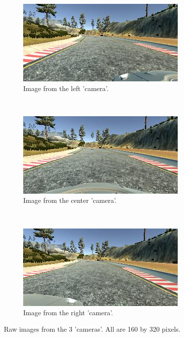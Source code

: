 \documentclass[12pt,a4paper]{article}
\begin{document}
\begin{figure}
    \centering
    \begin{subfigure}[b]{0.3\textwidth}
        \includegraphics[width=\textwidth]{left.jpg}
        \caption{Image from the left 'camera'.}
        \label{fig:left}
    \end{subfigure}
    ~ %
    \begin{subfigure}[b]{0.3\textwidth}
        \includegraphics[width=\textwidth]{center.jpg}
        \caption{Image from the center 'camera'.}
        \label{fig:center}
    \end{subfigure}
    ~ %
    \begin{subfigure}[b]{0.3\textwidth}
        \includegraphics[width=\textwidth]{right.jpg}
        \caption{Image from the right 'camera'.}
        \label{fig:right}
    \end{subfigure}
    \caption{Raw images from the 3 'cameras'. All are 160 by 320 pixels.}\label{fig:images}
\end{figure}
\end{document}
